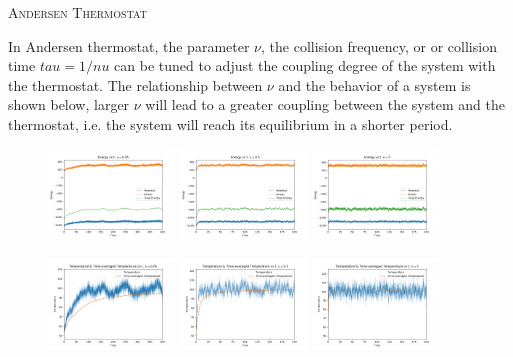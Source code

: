 \documentclass{article}
\begin{document}
\begin{spacing}{1}
\vspace{1.5em}
\textsc{\Large Andersen Thermostat}

In Andersen thermostat, the parameter $\nu$, the collision frequency, or or collision time $tau=1/nu$ can be tuned to adjust the coupling degree of the system with the thermostat. The relationship between $\nu$ and the behavior of a system is shown below, larger $\nu$ will lead to a greater coupling between the system and the thermostat, i.e. the system will reach its equilibrium in a shorter period.

\begin{figure}[htbp]
  \centering
  \includegraphics[width=0.3\textwidth]{andersen/nu005/test/Energy.png}
  \includegraphics[width=0.3\textwidth]{andersen/nu05/test/Energy.png}
  \includegraphics[width=0.3\textwidth]{andersen/nu5/test/Energy.png}
\end{figure}

\begin{figure}[htbp]
  \centering
  \includegraphics[width=0.3\textwidth]{andersen/nu005/test/T&aT.png}
  \includegraphics[width=0.3\textwidth]{andersen/nu05/test/T&aT.png}
  \includegraphics[width=0.3\textwidth]{andersen/nu5/test/T&aT.png}
\end{figure}


\end{spacing}
\end{document}
